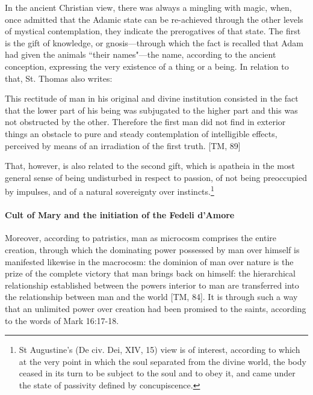 In the ancient Christian view, there was always a mingling with magic, when, once admitted that the Adamic state can be re-achieved through the other levels of mystical contemplation, they indicate the prerogatives of that state. The first is the gift of knowledge, or gnosis—through which the fact is recalled that Adam had given the animals ``their names"—the name, according to the ancient conception, expressing the very existence of a thing or a being. In relation to that, St. Thomas also writes:

\begin{quotex}
This rectitude of man in his original and divine institution consisted in the fact that the lower part of his being was subjugated to the higher part and this was not obstructed by the other. Therefore the first man did not find in exterior things an obstacle to pure and steady contemplation of intelligible effects, perceived by means of an irradiation of the first truth. [TM, 89] 

\end{quotex}
That, however, is also related to the second gift, which is apatheia in the most general sense of being undisturbed in respect to passion, of not being preoccupied by impulses, and of a natural sovereignty over instincts.\footnote{St Augustine's (De civ. Dei, XIV, 15) view is of interest, according to which at the very point in which the soul separated from the divine world, the body ceased in its turn to be subject to the soul and to obey it, and came under the state of passivity defined by concupiscence.}


\paragraph{Cult of Mary and the initiation of the Fedeli d'Amore}

Moreover, according to patristics, man as microcosm comprises the entire creation, through which the dominating power possessed by man over himself is manifested likewise in the macrocosm: the dominion of man over nature is the prize of the complete victory that man brings back on himself: the hierarchical relationship established between the powers interior to man are transferred into the relationship between man and the world [TM, 84]. It is through such a way that an unlimited power over creation had been promised to the saints, according to the words of Mark 16:17-18.

